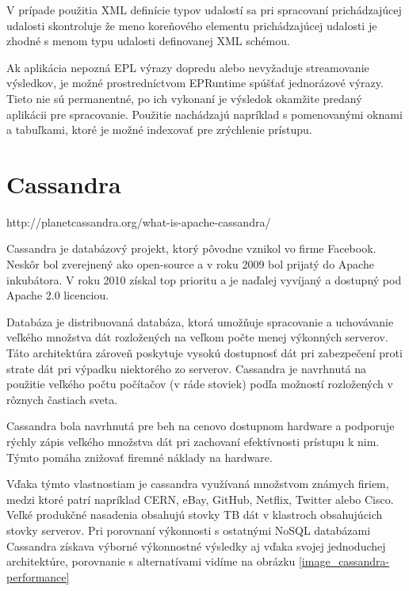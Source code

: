 		V prípade použitia XML definície typov udalostí sa pri spracovaní prichádzajúcej udalosti skontroluje že meno koreňového elementu prichádzajúcej udalosti je zhodné s menom typu udalosti definovanej XML schémou.
		
		Ak aplikácia nepozná EPL výrazy dopredu alebo nevyžaduje streamovanie výsledkov, je možné prostredníctvom EPRuntime spúšťať jednorázové výrazy. Tieto nie sú permanentné, po ich vykonaní je výsledok okamžite predaný aplikácii pre spracovanie. Použitie nachádzajú napríklad s pomenovanými oknami a tabuľkami, ktoré je možné indexovať pre zrýchlenie prístupu.		

\section{Cassandra}
	http://planetcassandra.org/what-is-apache-cassandra/
	
	Cassandra je databázový projekt, ktorý pôvodne vznikol vo firme Facebook. Neskôr bol zverejnený ako open-source a v roku 2009 bol prijatý do Apache inkubátora. V roku 2010 získal top prioritu a je naďalej vyvíjaný a dostupný pod Apache 2.0 licenciou.
	
	Databáza je distribuovaná databáza, ktorá umožňuje spracovanie a uchovávanie veľkého množstva dát rozložených na veľkom počte menej výkonných serverov. Táto architektúra zároveň poskytuje vysokú dostupnosť dát pri zabezpečení proti strate dát pri výpadku niektorého zo serverov. Cassandra je navrhnutá na použitie veľkého počtu počítačov (v ráde stoviek) podľa možností rozložených v rôznych častiach sveta.
	
	Cassandra bola navrhnutá pre beh na cenovo dostupnom hardware a podporuje rýchly zápis veľkého množstva dát pri zachovaní efektívnosti prístupu k nim. Týmto pomáha znižovať firemné náklady na hardware.
	
	Vďaka týmto vlastnostiam je cassandra využívaná množstvom známych firiem, medzi ktoré patrí napríklad CERN, eBay, GitHub, Netflix, Twitter alebo Cisco. Veľké produkčné nasadenia obsahujú stovky TB dát v klastroch obsahujúcich stovky serverov. Pri porovnaní výkonnosti s ostatnými NoSQL databázami  Cassandra získava výborné výkonnostné výsledky aj vďaka svojej jednoduchej architektúre, porovnanie s alternatívami vidíme na obrázku \ref{image_cassandra-performance}
	
	
